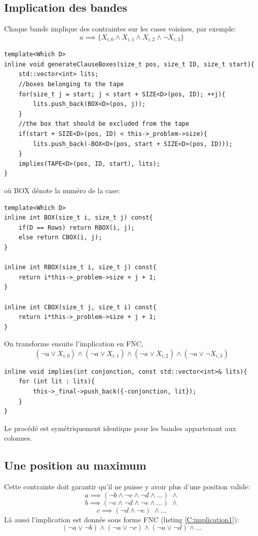 \documentclass[a4paper,12pt]{report}
\begin{document}
\subsection{Implication des bandes}
Chaque bande implique des contraintes sur les cases voisines, par exemple:
$$a \implies \{X_{i,0} \wedge X_{i,1} \wedge X_{i,2} \wedge \lnot X_{i,3}\}$$
\lstset{style=Cpp, caption=Une bande en FNC, label=C:Boxes}
\begin{lstlisting}[mathescape=true]
template<Which D>
inline void generateClauseBoxes(size_t pos, size_t ID, size_t start){
	std::vector<int> lits;
	//boxes belonging to the tape
	for(size_t j = start; j < start + SIZE<D>(pos, ID); ++j){
		lits.push_back(BOX<D>(pos, j));
	}
	//the box that should be excluded from the tape
	if(start + SIZE<D>(pos, ID) < this->_problem->size){
		lits.push_back(-BOX<D>(pos, start + SIZE<D>(pos, ID)));
	}
	implies(TAPE<D>(pos, ID, start), lits);
}
\end{lstlisting}
où BOX dénote la numéro de la case:
\lstset{style=Cpp, caption=Case, label=C:BOX}
\begin{lstlisting}[mathescape=true]
template<Which D>
inline int BOX(size_t i, size_t j) const{
	if(D == Rows) return RBOX(i, j);
	else return CBOX(i, j);
}

inline int RBOX(size_t i, size_t j) const{
	return i*this->_problem->size + j + 1;
}

inline int CBOX(size_t j, size_t i) const{
	return i*this->_problem->size + j + 1;
}
\end{lstlisting}

On transforme ensuite l'implication en FNC,
$$(\lnot a \vee X_{i,0}) \wedge ( \lnot a \vee X_{i,1}) \wedge ( \lnot a \vee X_{i,2}) \wedge (\lnot a \vee \lnot X_{i,3})$$
\lstset{style=Cpp, caption=Implication en FNC, label=C:implication1}
\begin{lstlisting}[mathescape=true]
inline void implies(int conjonction, const std::vector<int>& lits){
	for (int lit : lits){
		this->_final->push_back({-conjonction, lit});
	}
}
\end{lstlisting}

Le procédé est symétriquement identique pour les bandes appartenant aux colonnes.

\subsection{Une position au maximum}
Cette contrainte doit garantir qu'il ne puisse y avoir plus d'une position valide:
$$a \implies (\lnot b \wedge \lnot c \wedge \lnot d \wedge ... )\; \wedge$$
$$b \implies (\lnot c \wedge \lnot d \wedge \lnot e \wedge ... )\; \wedge$$
$$c \implies (\lnot d \wedge \lnot e)\; \wedge ...$$
Là aussi l'implication est donnée sous forme FNC (listing \ref{C:implication1}): 
$$(\lnot a \vee \lnot b) \wedge (\lnot a \vee \lnot c) \wedge (\lnot a \vee \lnot d) \wedge ...$$
\end{document}

